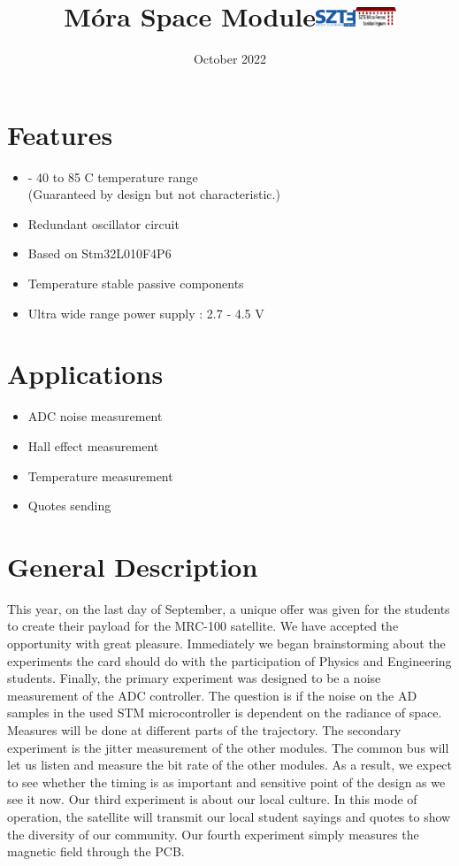 \documentclass[10pt]{datasheet}
\title{Móra Space Module\hfill\includegraphics[width=0.09\textwidth]{szte}\hspace{0.3cm}\includegraphics[width=0.09\textwidth]{mora}}
\date{October 2022}
\begin{document}
\maketitle

\section{Features}

\begin{itemize}
	\item{- 40 to 85 \textdegree C temperature range \\ (Guaranteed by design but not characteristic.)}
\item{Redundant oscillator circuit}
\item{Based on Stm32L010F4P6}
\item{Temperature stable passive components}
\item{Ultra wide range power supply : 2.7 - 4.5 V}
\end{itemize}

\section{Applications}

\begin{itemize}
\item{ADC noise measurement}
\item{Hall effect measurement}
\item{Temperature measurement}
\item{Quotes sending}
\end{itemize}

\section{General Description}
This year, on the last day of September, a unique offer was given for the students to create their payload for the MRC-100 satellite. We have accepted the opportunity with great pleasure. Immediately we began brainstorming about the experiments the card should do with the participation of Physics and Engineering students. Finally, the primary experiment was designed to be a noise measurement of the ADC controller. The question is if the noise on the AD samples in the used STM microcontroller is dependent on the radiance of space. Measures will be done at different parts of the trajectory.
The secondary experiment is the jitter measurement of the other modules. The common bus will let us listen and measure the bit rate of the other modules. As a result, we expect to see whether the timing is as important and sensitive point of the design as we see it now.
Our third experiment is about our local culture. In this mode of operation, the satellite will transmit our local student sayings and quotes to show the diversity of our community. 
Our fourth experiment simply measures the magnetic field through the PCB.
\end{document}

